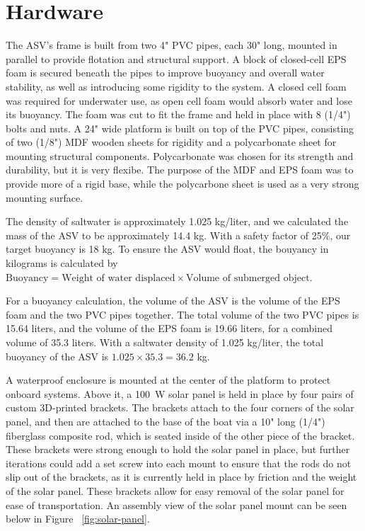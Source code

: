 \section{Hardware}

The ASV's frame is built from two 4" PVC pipes, each 30" long, mounted in parallel to provide flotation and structural support. A block of closed-cell EPS foam is secured beneath the pipes to improve buoyancy and overall water stability, as well as introducing some rigidity to the system. A closed cell foam was required for underwater use, as open cell foam would absorb water and lose its buoyancy. The foam was cut to fit the frame and held in place with 8 (1/4") bolts and nuts. A 24" wide platform is built on top of the PVC pipes, consisting of two (1/8") MDF wooden sheets for rigidity and a polycarbonate sheet for mounting structural components. Polycarbonate was chosen for its strength and durability, but it is very flexibe. The purpose of the MDF and EPS foam was to provide more of a rigid base, while the polycarbone sheet is used as a very strong mounting surface. 

The density of saltwater is approximately 1.025 kg/liter, and we calculated the mass of the ASV to be approximately 14.4 kg. With a safety factor of 25\%, our target buoyancy is 18 kg. To ensure the ASV would float, the bouyancy in kilograms is calculated by \(\text{Buoyancy} = \text{Weight of water displaced} \times \text{Volume of submerged object}\). 

For a buoyancy calculation, the volume of the ASV is the volume of the EPS foam and the two PVC pipes together. The total volume of the two PVC pipes is 15.64 liters, and the volume of the EPS foam is 19.66 liters, for a combined volume of 35.3 liters. With a saltwater density of 1.025 kg/liter, the total buoyancy of the ASV is \(1.025 \times 35.3 = 36.2 \) kg.

A waterproof enclosure is mounted at the center of the platform to protect onboard systems. Above it, a \SI{100}{\watt} solar panel is held in place by four pairs of custom 3D-printed brackets. The brackets attach to the four corners of the solar panel, and then are attached to the base of the boat via a 10" long (1/4") fiberglass composite rod, which is seated inside of the other piece of the bracket. These brackets were strong enough to hold the solar panel in place, but further iterations could add a set screw into each mount to ensure that the rods do not slip out of the brackets, as it is currently held in place by friction and the weight of the solar panel. These brackets allow for easy removal of the solar panel for ease of transportation. An assembly view of the solar panel mount can be seen below in Figure ~\ref{fig:solar-panel}.

